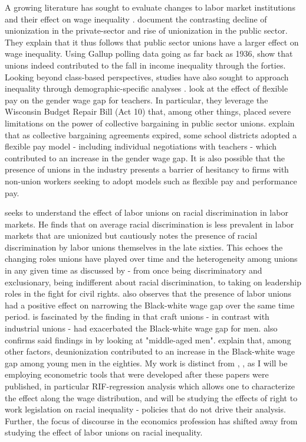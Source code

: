 \documentclass[11pt]{article}
\begin{document}
A growing literature has sought to evaluate changes to labor market institutions and their effect on wage inequality \citep[see, for example,][]{fll2021, fhkn2021, clr2020, ams2016, ffl2009, dfl1996}. \citet{clr2020} document the contrasting decline of unionization in the private-sector and rise of unionization in the public sector. They explain that it thus follows that public sector unions have a larger effect on wage inequality. Using Gallup polling data going as far back as 1936, \citet{fhkn2021} show that unions indeed contributed to the fall in income inequality through the forties. Looking beyond class-based perspectives, studies have also sought to approach inequality through demographic-specific analyses \citep[see, for example,][]{biasisarsons2020, blaukahn1996}. \citet{biasisarsons2020} look at the effect of flexible pay on the gender wage gap for teachers. In particular, they leverage the Wisconsin Budget Repair Bill (Act 10) that, among other things, placed severe limitations on the power of collective bargaining in public sector unions. \citet{biasisarsons2020} explain that as collective bargaining agreements expired, some school districts adopted a flexible pay model - including individual negotiations with teachers - which contributed to an increase in the gender wage gap. It is also possible that the presence of unions in the industry presents a barrier of hesitancy to firms with non-union workers seeking to adopt models such as flexible pay and performance pay.

\citet{ashenfelter1972} seeks to understand the effect of labor unions on racial discrimination in labor markets. He finds that on average racial discrimination is less prevalent in labor markets that are unionized but cautiously notes the presence of racial discrimination by labor unions themselves in the late sixties. This echoes the changing roles unions have played over time and the heterogeneity among unions in any given time as discussed by \citet{frymer2007} - from once being discriminatory and exclusionary, being indifferent about racial discrimination, to taking on leadership roles in the fight for civil rights. \citet{ashenfelter1972} also observes that the presence of labor unions had a positive effect on narrowing the Black-white wage gap over the same time period. \citet{leigh1978} is fascinated by the finding in \citet{ashenfelter1972} that craft unions - in contrast with industrial unions - had exacerbated the Black-white wage gap for men. \citet{leigh1978} also confirms said findings in \citet{ashenfelter1972} by looking at "middle-aged men". \citet{boundfreeman1992} explain that, among other factors, deunionization contributed to an increase in the Black-white wage gap among young men in the eighties. My work is distinct from \citet{ashenfelter1972}, \citet{leigh1978}, \citet{boundfreeman1992} as I will be employing econometric tools that were developed after these papers were published, in particular RIF-regression analysis which allows one to characterize the effect along the wage distribution, and will be studying the effects of right to work legislation on racial inequality - policies that do not drive their analysis. Further, the focus of discourse in the economics profession has shifted away from studying the effect of labor unions on racial inequality.
\end{document}
